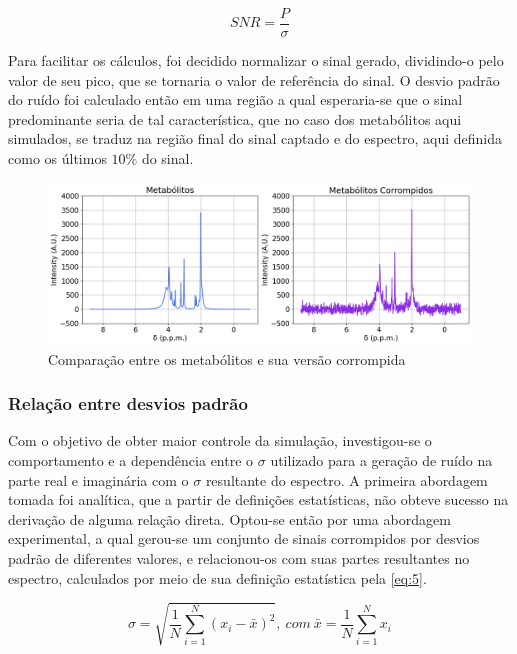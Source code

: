 \documentclass{article}
\begin{document}
\begin{equation} \label{eq:2}
    SNR = \frac{P}{\sigma}
\end{equation}

Para facilitar os cálculos, foi decidido normalizar o sinal gerado, dividindo-o pelo valor de seu pico, que se tornaria o valor de referência do sinal. O desvio padrão do ruído foi 
calculado então em uma região a qual esperaria-se que o sinal predominante seria de tal característica, que no caso dos metabólitos aqui simulados, se traduz na região final do sinal captado e do espectro, 
aqui definida como os últimos $10\%$ do sinal.

\begin{figure} [H]
    \includegraphics[scale=0.37]{metabolitos-corrompidos.png}
    \centering
    \caption{Comparação entre os metabólitos e sua versão corrompida}
    \label{fig:5}
\end{figure}

\subsubsection{Relação entre desvios padrão}

Com o objetivo de obter maior controle da simulação, investigou-se o comportamento e a dependência entre o $\sigma$ utilizado para a geração de ruído na parte real e imaginária com o $\sigma$ resultante do espectro. A primeira abordagem 
tomada foi analítica, que a partir de definições estatísticas, não obteve sucesso na derivação de alguma relação direta. Optou-se então por uma abordagem experimental, a qual gerou-se um conjunto de sinais 
corrompidos por desvios padrão de diferentes valores, e relacionou-os com suas partes resultantes no espectro, calculados por meio de sua definição 
estatística pela \autoref{eq:5}.

\begin{equation} \label{eq:5}
    \sigma = \sqrt{\frac{1}{N} \sum_{i=1}^{N} (x_i - \bar{x})^2}, \ com \ \bar{x} = \frac{1}{N} \sum_{i = 1}^{N} x_i  
\end{equation}
\end{document}
